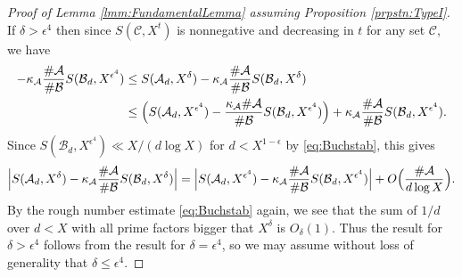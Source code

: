 \documentclass[10pt]{amsart}
\theoremstyle{plain}
\numberwithin{sblmm}{thrm}
\numberwithin{equation}{section}
\begin{document}
\begin{proof}[Proof of Lemma \ref{lmm:FundamentalLemma} assuming Proposition \ref{prpstn:TypeI}]
%
If $\delta>\epsilon^4$ then since $S(\mathcal{C},X^t)$ is nonnegative and decreasing in $t$ for any set $\mathcal{C}$, we have
%
\begin{align*}
-\kappa_\mathcal{A}\frac{\#\mathcal{A}{}}{\#\mathcal{B}}S(\mathcal{B}{}_d,X^{\epsilon^4})&\le S(\mathcal{A}{}_d,X^\delta)-\kappa_\mathcal{A}\frac{\#\mathcal{A}{}}{\#\mathcal{B}{}}S(\mathcal{B}{}_d,X^\delta)\\
&\le \Bigl(S(\mathcal{A}{}_d,X^{\epsilon^4})-\frac{\kappa_\mathcal{A}\#\mathcal{A}{}}{\#\mathcal{B}{}}S(\mathcal{B}{}_d,X^{\epsilon^4})\Bigr)+\kappa_\mathcal{A}\frac{\#\mathcal{A}{}}{\#\mathcal{B}{}}S(\mathcal{B}{}_d,X^{\epsilon^4}).
\end{align*}
%
Since $S(\mathcal{B}{}_d,X^{\epsilon^4})\ll X/(d\log{X})$ for $d<X^{1-\epsilon}$ by \eqref{eq:Buchstab}, this gives
\[
\Bigl| S(\mathcal{A}{}_d,X^\delta)-\kappa_\mathcal{A}\frac{\#\mathcal{A}{}}{\#\mathcal{B}{}}S(\mathcal{B}{}_d,X^\delta)\Bigr|=\Bigl|S(\mathcal{A}{}_d,X^{\epsilon^4})-\kappa_\mathcal{A}\frac{\#\mathcal{A}{}}{\#\mathcal{B}{}}S(\mathcal{B}{}_d,X^{\epsilon^4})\Bigr|+O\Bigl(\frac{\#\mathcal{A}{}}{d\log{X}}\Bigr).
\]
By the rough number estimate \eqref{eq:Buchstab} again, we see that the sum of $1/d$ over $d<X$ with all prime factors bigger that $X^\delta$ is $O_\delta(1)$. Thus the result for $\delta>\epsilon^4$ follows from the result for $\delta=\epsilon^4$, so we may assume without loss of generality that $\delta\le \epsilon^4$.


\end{proof}
\end{document}
